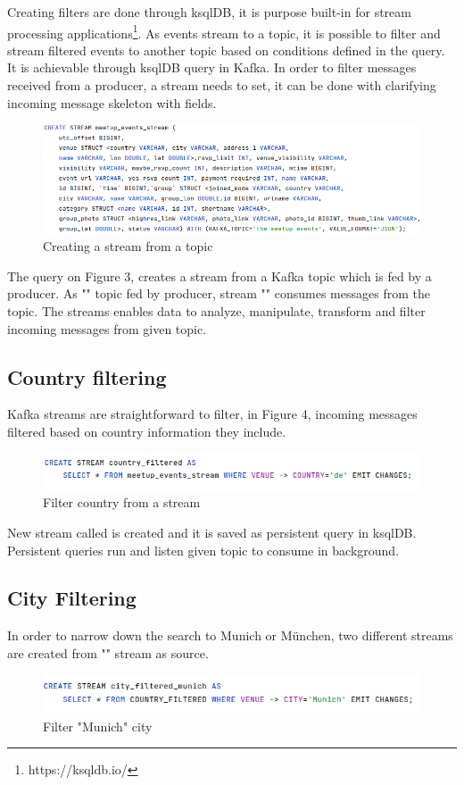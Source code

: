 \documentclass[sigplan,screen]{acmart}
\begin{document}
Creating filters are done through ksqlDB, it is purpose built-in for stream processing applications\footnote{https://ksqldb.io/}. As events stream to a topic, it is possible to filter and stream filtered events to another topic based on conditions defined in the query. It is achievable through ksqlDB query in Kafka. 
In order to filter messages received from a producer, a stream needs to set, it can be done with clarifying incoming message skeleton with fields\cite{create-stream}. 
\begin{figure}[H]
    \centerline{\includegraphics[scale=.3]{assets/create_stream_meetups.png}}
    \caption{Creating a stream from a topic }
    \label{fig}
\end{figure}
The query on Figure 3, creates a stream from a Kafka topic which is fed by a producer. As 
"" topic fed by producer, stream  "" consumes messages from the topic. The streams enables data to analyze, manipulate, transform and filter incoming messages from given topic. 
\subsection{Country filtering}
Kafka streams are straightforward to filter, in Figure 4, incoming messages filtered based on country information they include. 
\begin{figure}[H]
    \centerline{\includegraphics[scale=.3]{assets/filter_country_stream.png}}
    \caption{Filter country from a stream }
    \label{fig}
\end{figure}

New stream called  is created and it is saved as persistent query in ksqlDB. Persistent queries run and listen given topic to consume in background. 
\subsection{City Filtering}
In order to narrow down the search to Munich or München, two different streams are created from "" stream as source. 
\begin{figure}[H]
    \centerline{\includegraphics[scale=.3]{assets/filter_munich_stream.png}}
    \caption{Filter "Munich" city  }
    \label{fig}
\end{figure}
\end{document}
